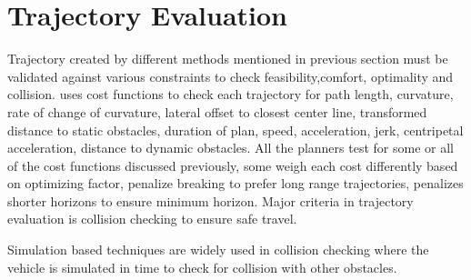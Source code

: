 \section{Trajectory Evaluation}
\label{traj_eval}
Trajectory created by different methods mentioned in previous section must be validated against various constraints to check feasibility,comfort, optimality and collision. \cite{traj_planner_optimization} uses cost functions to check each trajectory for path length, curvature, rate of change of curvature, lateral offset to closest center line, transformed distance to static obstacles, duration of plan, speed, acceleration, jerk, centripetal acceleration, distance to dynamic obstacles. All the planners test for some or all of the cost functions discussed previously, some weigh each cost differently based on optimizing factor, \cite{unit_A_star} penalize breaking to prefer long range trajectories, \cite{cmu_parallel_thesis} penalizes shorter horizons to ensure minimum horizon. Major criteria in trajectory evaluation is collision checking to ensure safe travel. 

Simulation based techniques are widely used in collision checking where the vehicle is simulated in time to check for collision with other obstacles.

